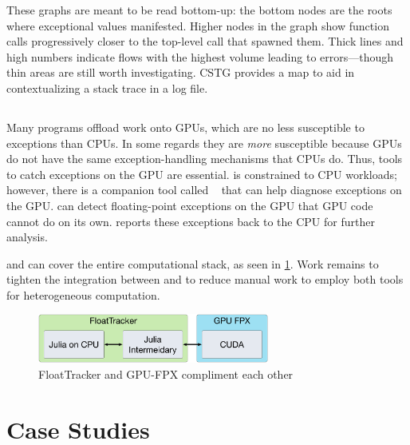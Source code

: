 \documentclass{juliacon}
\begin{document}
These graphs are meant to be read bottom-up: the bottom nodes are the roots where exceptional values manifested.
Higher nodes in the graph show function calls progressively closer to the top-level call that spawned them.
Thick lines and high numbers indicate flows with the highest volume leading to errors---though thin areas are still worth investigating.
CSTG provides a map to aid in contextualizing a stack trace in a log file.

\subsection{\GPUFPX{}}
\label{s:gpufpx}

Many programs offload work onto GPUs, which are no less susceptible to \fp{} exceptions than CPUs.
In some regards they are \emph{more} susceptible because GPUs do not have the same exception-handling mechanisms that CPUs do.
Thus, tools to catch \fp{} exceptions on the GPU are essential.
\FT{} is constrained to CPU workloads; however, there is a companion tool called \GPUFPX{}~\cite{llsflg-hpdc-2023} that can help diagnose \fp{} exceptions on the GPU.
\GPUFPX{} can detect floating-point exceptions on the GPU that GPU code cannot do on its own.
\GPUFPX{} reports these exceptions back to the CPU for further analysis.

\FT{} and \GPUFPX{} can cover the entire computational stack, as seen in \cref{fig:ft_and_gpu_fpx}.
Work remains to tighten the integration between \FT{} and \GPUFPX{} to reduce manual work to employ both tools for heterogeneous computation.

\begin{figure}[t]
  \centering
  \includegraphics[width=3in]{./fig/float_tracker_context_boxes.png}
  \caption{FloatTracker and GPU-FPX compliment each other}
  \label{fig:ft_and_gpu_fpx}
\end{figure}

\section{Case Studies}
\label{s:casestudies}
\end{document}
